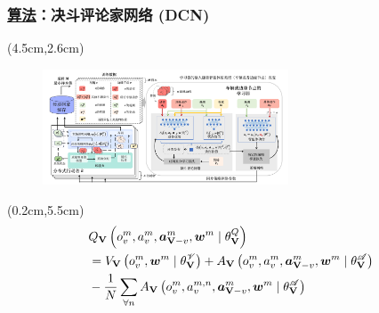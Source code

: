 \begin{frame}
\frametitle{\englishfont \underline{算法}：决斗评论家网络 (DCN)}
\newBackground
\begin{center}
\begin{textblock*}{\textwidth}(4.5cm,2.6cm)
\begin{figure}
\includegraphics[width=0.65\textwidth]{fig/Fig4-2-solution-model.pdf}
\end{figure}
\end{textblock*}
\end{center}

\begin{center}
\begin{textblock*}{0.6\textwidth}(0.2cm,5.5cm)
\begin{align} \footnotesize
    & Q_{\mathbf{V}}\left({o}_{v}^{m}, {a}_{v}^{m}, \boldsymbol{a}_{\boldsymbol{\mathbf{V}}-v}^{m}, \boldsymbol{w}^{m} \mid \theta_{\mathbf{V}}^{Q} \right) \notag \\
    &= V_{\mathbf{V}}\left({o}_{v}^{m}, \boldsymbol{w}^{m} \mid \theta_{\mathbf{V}}^{\mathscr{V}} \right) + A_{\mathbf{V}}\left({o}_{v}^{m},  {a}_{v}^{m}, \boldsymbol{a}_{\boldsymbol{\mathbf{V}}-v}^{m}, \boldsymbol{w}^{m} \mid \theta_{\mathbf{V}}^{\mathscr{A}} \right) \notag \\
    &- \frac{1}{N} \sum_{\forall n} A_{\mathbf{V}}\left({o}_{v}^{m},  {a}_{v}^{m, n}, \boldsymbol{a}_{\boldsymbol{\mathbf{V}}-v}^{m}, \boldsymbol{w}^{m} \mid \theta_{\mathbf{V}}^{\mathscr{A}} \right) \notag
\end{align}

\end{textblock*}
\end{center}


\end{frame}
